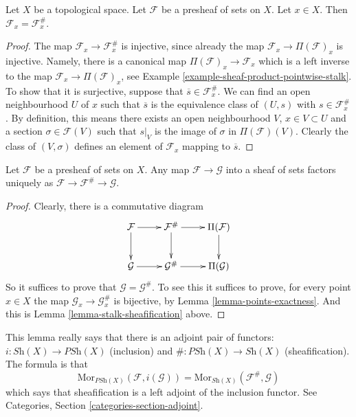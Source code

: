 \begin{lemma}
\label{lemma-stalk-sheafification}
Let $X$ be a topological space.
Let $\mathcal{F}$ be a presheaf of sets on $X$.
Let $x \in X$. Then $\mathcal{F}_x = \mathcal{F}^\#_x$.
\end{lemma}

\begin{proof}
The map $\mathcal{F}_x \to \mathcal{F}^\#_x$
is injective, since already the map
$\mathcal{F}_x \to \Pi(\mathcal{F})_x$ is injective.
Namely, there is a canonical map $\Pi(\mathcal{F})_x \to \mathcal{F}_x$
which is a left inverse to the map $\mathcal{F}_x \to \Pi(\mathcal{F})_x$,
see Example \ref{example-sheaf-product-pointwise-stalk}.
To show that it is surjective, suppose that
$\overline{s} \in \mathcal{F}^\#_x$.
We can find an open neighbourhood $U$ of $x$ such that
$\overline{s}$ is the equivalence class of $(U, s)$
with $s \in \mathcal{F}^\#_x$.
By definition, this means there exists an open neighbourhood
$V$, $x \in V \subset U$ and a section $\sigma \in \mathcal{F}(V)$
such that $s|_V$ is the image of $\sigma$ in $\Pi(\mathcal{F})(V)$.
Clearly the class of $(V, \sigma)$ defines an element of
$\mathcal{F}_x$ mapping to $\overline{s}$.
\end{proof}

\begin{lemma}
\label{lemma-sheafifiy-universal}
Let $\mathcal{F}$ be a presheaf of sets on $X$.
Any map $\mathcal{F} \to \mathcal{G}$ into a sheaf of sets 
factors uniquely as
$\mathcal{F} \to \mathcal{F}^\# \to \mathcal{G}$.
\end{lemma}

\begin{proof}
Clearly, there is a commutative diagram
$$
\xymatrix{
\mathcal{F} \ar[r] \ar[d] &
\mathcal{F}^\# \ar[r] \ar[d] &
\Pi(\mathcal{F}) \ar[d] \\
\mathcal{G} \ar[r] &
\mathcal{G}^\# \ar[r] &
\Pi(\mathcal{G}) \\
}
$$
So it suffices to prove that $\mathcal{G} = \mathcal{G}^\#$.
To see this it suffices to prove, for every point $x \in X$ the
map $\mathcal{G}_x \to \mathcal{G}^\#_x$ is bijective, by
Lemma \ref{lemma-points-exactness}. And this is Lemma
\ref{lemma-stalk-sheafification} above.
\end{proof}

\noindent
This lemma really says that there is an adjoint pair
of functors: $i : \textit{Sh}(X) \to \textit{PSh}(X)$
(inclusion) and $\# : \textit{PSh}(X) \to \textit{Sh}(X)$
(sheafification). The formula is that
$$
\text{Mor}_{\textit{PSh}(X)}(\mathcal{F}, i(\mathcal{G}))
=
\text{Mor}_{\textit{Sh}(X)}(\mathcal{F}^\#, \mathcal{G})
$$
which says that sheafification is a left adjoint of
the inclusion functor. See Categories, Section
\ref{categories-section-adjoint}.





